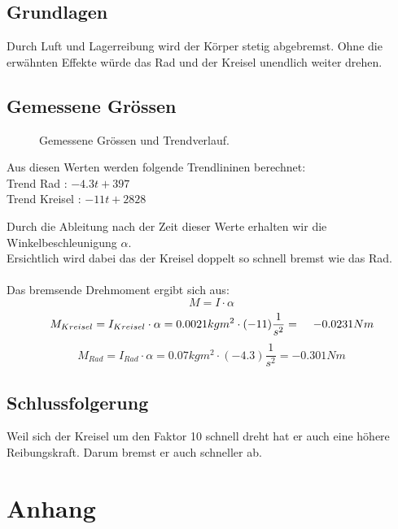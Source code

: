 \documentclass{article}
\begin{document}
\subsection{Grundlagen}
Durch Luft und Lagerreibung wird der Körper stetig abgebremst. Ohne die erwähnten Effekte würde das Rad und der Kreisel unendlich weiter drehen.
\subsection{Gemessene Grössen}

\begin{figure}[H]
\caption{Gemessene Grössen und Trendverlauf.}
\end{figure}
Aus diesen Werten werden folgende Trendlininen berechnet:\\
Trend Rad : \hspace{2cm}$-4.3t+397 $\\
Trend Kreisel : \hspace{1.58cm}$-11t+2828$

Durch die Ableitung nach der Zeit dieser Werte erhalten wir die Winkelbeschleunigung $\alpha$.\\
Ersichtlich wird dabei das der Kreisel doppelt so schnell bremst wie das Rad.\\\\
Das bremsende Drehmoment ergibt sich aus: 
\begin{equation}
M=I\cdot \alpha
\end{equation}
\begin{equation}
M_{Kreisel} = I_{Kreisel}\cdot \alpha = 0.0021kgm^2 \cdot (-11)\frac{1}{s^2} = \hspace{0.4cm}-0.0231Nm\\
\end{equation}
\begin{equation}
M_{Rad} = I_{Rad}\cdot \alpha= 0.07kgm^2 \cdot (-4.3)\frac{1}{s^2}  =  -0.301Nm
\end{equation}





\subsection{Schlussfolgerung}
Weil sich der Kreisel um den Faktor 10 schnell dreht hat er auch eine höhere Reibungskraft. Darum bremst er auch schneller ab.
\newpage
\section{Anhang}

\begin{figure}[H]
\label{Anhang}
\end{figure} 
\end{document}
